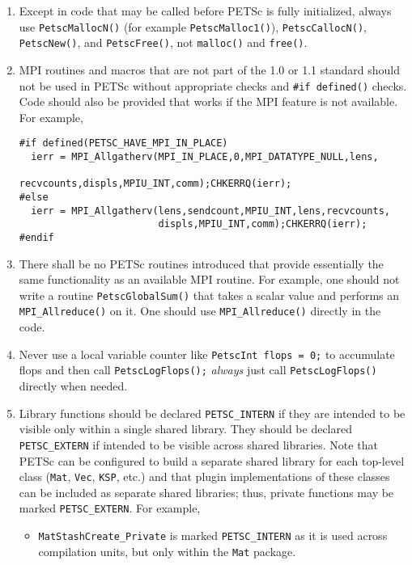 \begin{enumerate}
\begin{lstlisting}
\end{lstlisting}
\item Except in code that may be called before PETSc is fully initialized, always use \lstinline{PetscMallocN()} (for example \lstinline{PetscMalloc1()}), \lstinline{PetscCallocN()}, \lstinline{PetscNew()}, and \lstinline{PetscFree()}, not \lstinline{malloc()} and \lstinline{free()}.
\item MPI routines and macros that are not part of the 1.0 or 1.1 standard should not be used in PETSc without appropriate  checks and \lstinline{#if defined()} checks. 
 Code should also be provided that works if the MPI feature is not available. For example, 
\begin{lstlisting}
#if defined(PETSC_HAVE_MPI_IN_PLACE)
  ierr = MPI_Allgatherv(MPI_IN_PLACE,0,MPI_DATATYPE_NULL,lens,
                        recvcounts,displs,MPIU_INT,comm);CHKERRQ(ierr);
#else
  ierr = MPI_Allgatherv(lens,sendcount,MPIU_INT,lens,recvcounts,
                        displs,MPIU_INT,comm);CHKERRQ(ierr);
#endif
\end{lstlisting}
\item There shall be no PETSc routines introduced that provide essentially the same functionality as an available MPI routine. 
  For example, one should not write a routine \lstinline{PetscGlobalSum()} that takes a scalar value and performs an \lstinline{MPI_Allreduce()} on it. 
  One should use \lstinline{MPI_Allreduce()} directly in the code.
\item Never use a local variable counter like \lstinline{PetscInt flops = 0;} to accumulate flops and then call \lstinline{PetscLogFlops();} {\em always} just
  call \lstinline{PetscLogFlops()} directly when needed.
\item \label{styleitem:petscextern} Library functions should be declared \lstinline{PETSC_INTERN} if they are intended to be visible only within a single shared library. 
They should be declared \lstinline{PETSC_EXTERN} if intended to be visible across shared libraries. 
Note that PETSc can be configured to build a separate shared library for each top-level class (\lstinline{Mat}, \lstinline{Vec}, \lstinline{KSP}, etc.) and that plugin implementations of these classes can be included as separate shared libraries; thus, private functions may be marked \lstinline{PETSC_EXTERN}.
For example, 
\begin{itemize}
\item \lstinline{MatStashCreate_Private} is marked \lstinline{PETSC_INTERN} as it is used across compilation units, but only within the \lstinline{Mat} package.

\end{itemize}
\end{enumerate}
